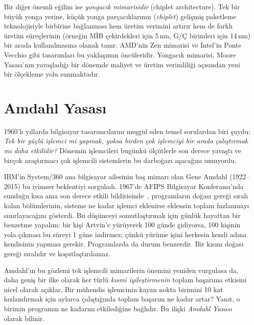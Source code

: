 Bir diğer önemli eğilim ise \emph{yongacık mimarisidir} (chiplet architecture). Tek bir büyük yonga yerine, küçük yonga parçacıklarının (\emph{chiplet}) gelişmiş paketleme teknolojisiyle birbirine bağlanması hem üretim verimini artırır hem de farklı üretim süreçlerinin (örneğin MİB çekirdekleri için 5\,nm, G/Ç birimleri için 14\,nm) bir arada kullanılmasına olanak tanır. AMD'nin Zen mimarisi ve Intel'in Ponte Vecchio gibi tasarımları bu yaklaşımın öncüleridir. Yongacık mimarisi, Moore Yasası'nın yavaşladığı bir dönemde maliyet ve üretim verimliliği açısından yeni bir ölçekleme yolu sunmaktadır.


\section{Amdahl Yasası}
\label{sec:amdahl}

1960'lı yıllarda bilgisayar tasarımcılarını meşgul eden temel sorulardan biri şuydu: \emph{Tek bir güçlü işlemci mi yapmak, yoksa birden çok işlemciyi bir arada çalıştırmak mı daha etkilidir?} Dönemin işlemcileri bugünkü ölçütlerle son derece yavaştı ve birçok araştırmacı çok işlemcili sistemlerin bu darboğazı aşacağını umuyordu.

IBM'in System/360 ana bilgisayar ailesinin baş mimarı olan Gene Amdahl (1922--2015) bu iyimser beklentiyi sorguladı. 1967'de AFIPS Bilgisayar Konferansı'nda sunduğu kısa ama son derece etkili bildirisinde~\cite{amdahl1967}, programların doğası gereği sıralı kalan bölümlerinin, sisteme ne kadar işlemci eklenirse eklensin toplam hızlanmayı sınırlayacağını gösterdi. Bu düşünceyi somutlaştırmak için günlük hayattan bir benzetme yapalım: bir kişi Artvin'e yürüyerek 100 günde gidiyorsa, 100 kişinin yola çıkması bu süreyi 1 güne indirmez; çünkü yürüme işini herkesin kendi adına kendisinin yapması gerekir. Programlarda da durum benzerdir. Bir kısmı doğası gereği sıralıdır ve koşutlaştırılamaz.

Amdahl'ın bu gözlemi tek işlemcili mimarilerin önemini yeniden vurgulasa da, daha geniş bir ilke olarak her türlü \emph{kısmi iyileştirmenin} toplam başarıma etkisini nicel olarak açıklar. Bir mühendis işlemcinin kayan nokta birimini 10 kat hızlandırmak için aylarca çalıştığında toplam başarım ne kadar artar? Yanıt, o birimin programın ne kadarını etkilediğine bağlıdır. Bu ilişki \emph{Amdahl Yasası} olarak bilinir.

